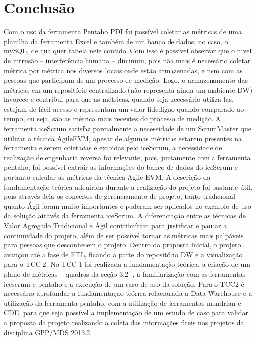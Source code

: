 \chapter*[Conclusão]{Conclusão}
Com o uso da ferramenta Pentaho PDI foi possível coletar as métricas de uma planilha da ferramenta Excel e também de um banco de dados, no caso, o mySQL, de qualquer tabela nele contido. Com isso é possível observar que o nível de intrusão – interferência humana – diminuiu, pois não mais é necessário coletar métrica por métrica nos diversos locais onde estão armazenadas, e nem com as pessoas que participam de um processo de medição.
Logo, o armazenamento das métricas em um repositório centralizado (não representa ainda um ambiente DW) favorece e contribui para que as métricas, quando seja necessário utiliza-las, estejam de fácil acesso e representam um valor fidedigno quando comparado ao tempo, ou seja, são as métrica mais recentes do processo de medição.
A ferramenta iceScrum satisfaz parcialmente a necessidade de um ScrumMaster que utilizar a técnica AgileEVM, apesar de algumas métricas estarem presentes na ferramenta e serem coletadas e exibidas pelo iceScrum, a necessidade de realização de engenharia reversa foi relevante, pois, juntamente com a ferramenta pentaho, foi possível extrair as informações do banco de dados do iceScrum e portanto calcular as métricas da técnica Agile EVM.
A descrição da fundamentação teórica adquirida durante a realização do projeto foi bastante útil, pois através dela os conceitos de gerenciamento de projeto, tanto tradicional quanto Ágil foram muito importantes e puderam ser aplicados no exemplo de uso da solução através da ferramenta iceScrum.
A diferenciação entre as técnicas de Valor Agregado Tradicional e Ágil contribuíram para justificar e pautar a continuidade do projeto, além de ser possível tornar as métricas mais palpáveis para pessoas que desconhecem o projeto.
Dentro da proposta inicial, o projeto avançou até a fase de ETL, ficando a parte do repositório DW e a visualização para o TCC 2.
No TCC 1 foi realizada a fundamentação teórica, a criação de um plano de métricas – quadros da seção 3.2 -, a familiarização com as ferramentas icescrum e pentaho e a execução de um caso de uso da solução.
Para o TCC2 é necessário aprofundar a fundamentação teórica relacionada a Data Warehouse e a utilização da ferramenta pentaho, com a utilização de ferramentas mondrian e CDE, para que seja possível a implementação de um estudo de caso para validar a proposta do projeto realizando a coleta das informações úteis nos projetos da disciplina GPP/MDS 2013.2.

